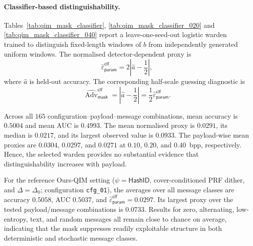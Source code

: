 \documentclass[journal]{IEEEtran}
\theoremstyle{definition}
\theoremstyle{game}
\begin{document}
\paragraph{Classifier-based distinguishability.}
Tables~\ref{tab:qim_mask_classifier}, \ref{tab:qim_mask_classifier_020} and \ref{tab:qim_mask_classifier_040} report a leave-one-seed-out logistic
warden trained to distinguish fixed-length windows of $b$ from independently
generated uniform windows. The normalised detector-dependent proxy is
\begin{equation}
 \widehat{\varepsilon}_{\mathsf{param}}^{\mathsf{clf}}
 =
 2\left|\widehat a-\frac{1}{2}\right|,
 \label{eq:supp_classifier_proxy}
\end{equation}
where $\widehat a$ is held-out accuracy. The corresponding half-scale
guessing diagnostic is
\begin{equation}
 \widehat{\operatorname{Adv}}_{\mathsf{mask}}^{\mathsf{clf}}
 =
 \left|\widehat a-\frac{1}{2}\right|
 =
 \frac{1}{2}
 \widehat{\varepsilon}_{\mathsf{param}}^{\mathsf{clf}}.
 \label{eq:supp_classifier_half_scale}
\end{equation}

Across all $165$ configuration--payload--message combinations, mean accuracy
is $0.5004$ and mean AUC is $0.4993$. The mean normalised proxy is $0.0291$,
its median is $0.0217$, and its largest observed value is $0.0933$. The
payload-wise mean proxies are $0.0304$, $0.0297$, and $0.0271$ at $0.10$,
$0.20$, and $0.40$~bpp, respectively. Hence, the selected warden provides no
substantial evidence that distinguishability increases with payload.

For the reference Ours-QIM setting
($\psi=\textsf{HashID}$, cover-conditioned PRF dither, and
$\Delta=\Delta_0$; configuration \texttt{cfg\_01}), the averages over all
message classes are accuracy $0.5058$, AUC $0.5037$, and
$\widehat{\varepsilon}_{\mathsf{param}}^{\mathsf{clf}}=0.0297$. Its largest
proxy over the tested payload/message combinations is $0.0733$. Results for
zero, alternating, low-entropy, text, and random messages all remain close to
chance on average, indicating that the mask suppresses readily exploitable
structure in both deterministic and stochastic message classes.

%
\end{document}
